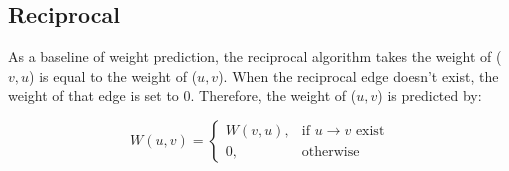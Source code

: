 \subsection{Reciprocal}
As a baseline of weight prediction, the reciprocal algorithm takes the 
weight of ($v,u$) is equal to the weight of ($u,v$). When the reciprocal edge 
doesn't exist, the weight of that edge is set to 0. Therefore, the weight of ($u,v$)
is predicted by:

\begin{equation}
W(u,v) =
\begin{cases}
W(v,u),& \text{if $u \rightarrow v$ exist} \\
0,&  \text{otherwise}
\end{cases}
\end{equation}





